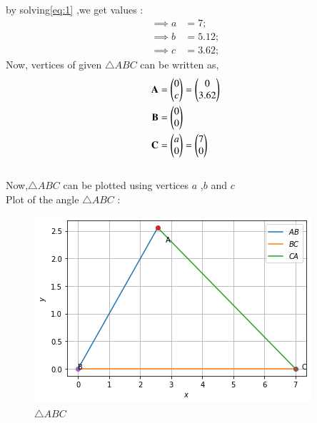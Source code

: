 \documentclass[journal,12pt,twocolumn]{IEEEtran}
\begin{document}
by solving\eqref{eq:1} ,we get values :
\begin{align}
    \implies a &=7;
    \\
    \implies b &=5.12;
    \\
    \implies c &=3.62;
 \end{align}
Now, vertices of given $\triangle ABC$ can be written as,
\begin{align}
\mathbf{A} &=\begin{pmatrix}0\\c\end{pmatrix}=\begin{pmatrix}0\\3.62\end{pmatrix}
\\
\mathbf{B} &=\begin{pmatrix}0\\0\end{pmatrix}
\\
\mathbf{C} &=\begin{pmatrix}a\\0\end{pmatrix}=\begin{pmatrix}7\\0\end{pmatrix}
\end{align}
\\
Now,$\triangle ABC$ can be plotted using vertices $a$ ,$b$ and $c$
\\
Plot of the angle $\triangle ABC$ :
\begin{figure}[!ht]
\centering
\includegraphics[width=\columnwidth]{figure.png}
\caption{$\triangle ABC$}
\label{fig:$\triangle ABC$}
\end{figure}    
\end{document}
